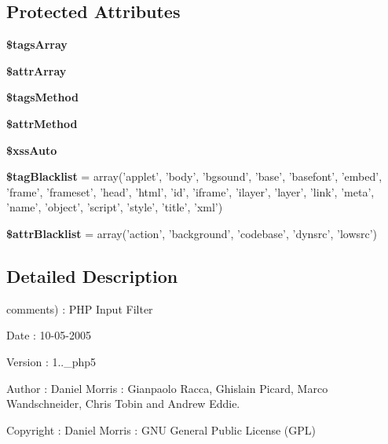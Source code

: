 \subsection*{Protected Attributes}
\begin{DoxyCompactItemize}
\item 
\hypertarget{class_input_filter_ae7f8f42c50985c03196222b4f1539ee0}{{\bfseries \$tags\-Array}}\label{class_input_filter_ae7f8f42c50985c03196222b4f1539ee0}

\item 
\hypertarget{class_input_filter_a39fb95773386c0379371b2520dd8cd8d}{{\bfseries \$attr\-Array}}\label{class_input_filter_a39fb95773386c0379371b2520dd8cd8d}

\item 
\hypertarget{class_input_filter_a8045801eda1e935339329800ec06bfba}{{\bfseries \$tags\-Method}}\label{class_input_filter_a8045801eda1e935339329800ec06bfba}

\item 
\hypertarget{class_input_filter_a3d010c4cf00e557c98fdfd6376ff85b4}{{\bfseries \$attr\-Method}}\label{class_input_filter_a3d010c4cf00e557c98fdfd6376ff85b4}

\item 
\hypertarget{class_input_filter_aebb1642f22abcf61c4a863789e36bbb1}{{\bfseries \$xss\-Auto}}\label{class_input_filter_aebb1642f22abcf61c4a863789e36bbb1}

\item 
\hypertarget{class_input_filter_a729b176d3d97e4d8961e15fe622ea58e}{{\bfseries \$tag\-Blacklist} = array('applet', 'body', 'bgsound', 'base', 'basefont', 'embed', 'frame', 'frameset', 'head', 'html', 'id', 'iframe', 'ilayer', 'layer', 'link', 'meta', 'name', 'object', 'script', 'style', 'title', 'xml')}\label{class_input_filter_a729b176d3d97e4d8961e15fe622ea58e}

\item 
\hypertarget{class_input_filter_a5d1cf3b7473a284ddbb8573cf52a2718}{{\bfseries \$attr\-Blacklist} = array('action', 'background', 'codebase', 'dynsrc', 'lowsrc')}\label{class_input_filter_a5d1cf3b7473a284ddbb8573cf52a2718}

\end{DoxyCompactItemize}


\subsection{Detailed Description}
comments)  \-: P\-H\-P Input Filter \begin{DoxyDate}{Date}
\-: 10-\/05-\/2005 
\end{DoxyDate}
\begin{DoxyVersion}{Version}
\-: 1..\-\_\-php5 
\end{DoxyVersion}
\begin{DoxyAuthor}{Author}
\-: Daniel Morris \-: Gianpaolo Racca, Ghislain Picard, Marco Wandschneider, Chris Tobin and Andrew Eddie. 
\end{DoxyAuthor}
\begin{DoxyCopyright}{Copyright}
\-: Daniel Morris  \-: G\-N\-U General Public License (G\-P\-L) 
\end{DoxyCopyright}


